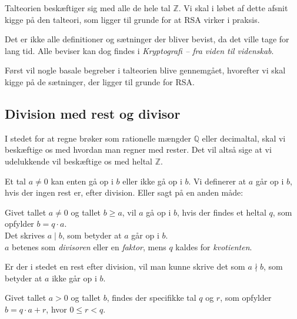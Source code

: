 

Talteorien beskæftiger sig med alle de hele tal \(\mathbb{Z}\).
Vi skal i løbet af dette afsnit kigge på den talteori, som ligger til grunde for at RSA virker i praksis.

Det er ikke alle definitioner og sætninger der bliver bevist, da det ville tage for lang tid.
Alle beviser kan dog findes i \textit{Kryptografi -- fra viden til videnskab}. \cite{krypto}
\par
Først vil nogle basale begreber i talteorien blive gennemgået, hvorefter vi skal kigge på de sætninger, der ligger til grunde for RSA.

\subsection{Division med rest og divisor}
I stedet for at regne brøker som rationelle mængder \(\mathbb{Q}\) eller decimaltal, skal vi beskæftige os med hvordan man regner med rester.
Det vil altså sige at vi udelukkende vil beskæftige os med heltal \(\mathbb{Z}\).

Et tal \(a \neq 0\) kan enten gå op i \(b\) eller ikke gå op i \(b\).
Vi definerer at \(a\) går op i \(b\), hvis der ingen rest er, efter division. Eller sagt på en anden måde:


\begin{definition}
    \label{heldiv}
    Givet tallet \(a \neq 0\) og tallet \(b \geq a\), vil \(a\) gå op i \(b\),
    hvis der findes et heltal \(q\), som opfylder \(b = q \cdot a\).\\
    Det skrives \(a \mid b\), som betyder at \(a\) går op i \(b\).\\
    \(a\) betenes som \textit{divisoren} eller en \textit{faktor},
    mens \(q\) kaldes for \textit{kvotienten}.\cite[70]{krypto}
\end{definition}

Er der i stedet en rest efter division, vil man kunne skrive det som \(a \nmid b\), som betyder at \(a\) ikke går op i \(b\).

\begin{sent}
    \label{rest}
    Givet tallet \(a > 0\) og tallet \(b\), findes der specifikke tal \(q\) og \(r\), som opfylder \(b = q \cdot a + r\), hvor \(0 \leq r < q\). %
\end{sent}



